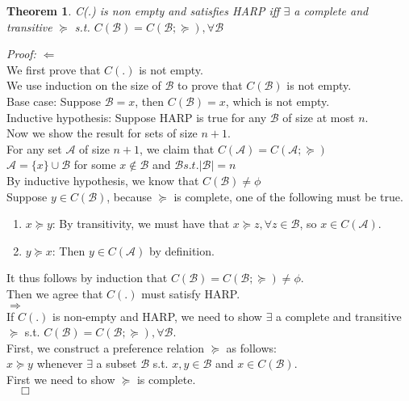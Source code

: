 \documentclass[11pt]{article}
\newtheorem{theorem}{Theorem}
\newenvironment{proof}{\noindent\emph{Proof:}}{$\quad \Box$}
\begin{document}
\begin{theorem}
  C(.) is non empty and satisfies HARP iff $\exists$ a complete and transitive $\succeq$ s.t. $C(\mathcal{B})=C(\mathcal{B};\succeq), \forall \mathcal{B}$
\end{theorem}
\begin{proof}
  $\Longleftarrow$    \\
  We first prove that $C(.)$ is not empty. \\
  We use induction on the size of $\mathcal{B}$ to prove that $C(\mathcal{B})$ is not empty.\\
  Base case: Suppose $\mathcal{B}={x}$, then $C(\mathcal{B})=x$, which is not empty.\\
  Inductive hypothesis: Suppose HARP is true for any $\mathcal{B}$  of size at most $n$.\\
  Now we show the result for sets of size $n+1$.\\
  For any set $\mathcal{A}$ of size $n+1$, we claim that $C(\mathcal{A})=C(\mathcal{A};\succeq)$ \\
  $\mathcal{A}=\{x\}\cup \mathcal{B}$ for some $x \notin \mathcal{B}$ and $\mathcal{B} s.t. |\mathcal{B}|=n$\\
  By inductive hypothesis, we know that $C(\mathcal{B})\neq \phi$\\
  Suppose $y\in C(\mathcal{B})$, because $\succeq$ is complete, one of the following must be true.
  \begin{enumerate}
    \item $x \succeq y$: By transitivity, we must have that $x \succeq z, \forall z \in \mathcal{B}$, so $x\in C(\mathcal{A})$.
    \item $y \succeq x$: Then $y \in C(\mathcal{A})$ by definition.
  \end{enumerate}
  It thus follows by induction that $C(\mathcal{B})=C(\mathcal{B};\succeq)\neq \phi$.\\
  Then we agree that $C(.)$ must satisfy HARP.\\
  $\Longrightarrow$ \\
  If $C(.)$ is non-empty and HARP, we need to show $\exists$ a complete and transitive $\succeq$ s.t. $C(\mathcal{B})=C(\mathcal{B};\succeq), \forall \mathcal{B}$.\\
  First, we construct a preference relation $\succeq$ as follows:\\
  $x \succeq y$ whenever $\exists$ a subset $\mathcal{B}$ s.t. $x, y \in \mathcal{B}$ and $x \in C(\mathcal{B})$.\\
  First we need to show $\succeq$ is complete.\\

\end{proof}
\end{document}
